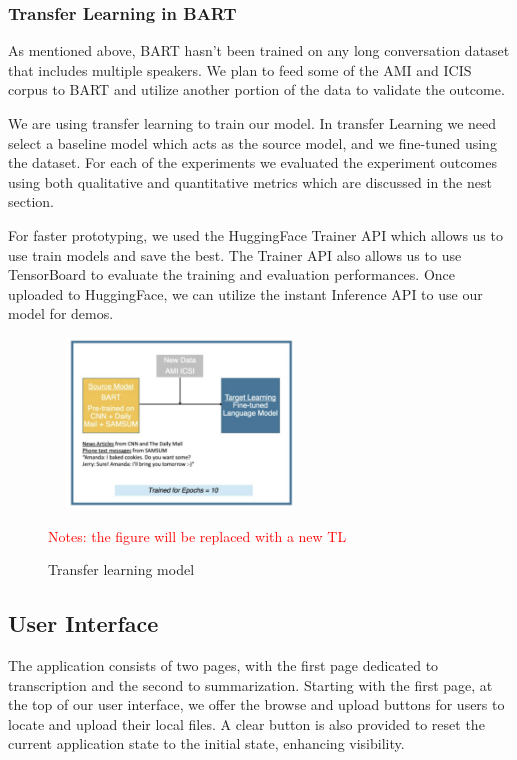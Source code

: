 \subsubsection{Transfer Learning in BART}
As mentioned above, BART hasn’t been trained on any long conversation dataset that includes multiple speakers. We plan to feed some of the AMI and ICIS corpus to BART and utilize another portion of the data to validate the outcome.

We are using transfer learning to train our model. In transfer Learning we need select a baseline model which acts as the source model, and we fine-tuned using the dataset. For each of the experiments we evaluated the experiment outcomes using both qualitative and quantitative metrics which are discussed in the nest section.

For faster prototyping, we used the HuggingFace Trainer API which allows us to use train models and save the best. The Trainer API also allows us to use TensorBoard to evaluate the training and evaluation performances. Once uploaded to HuggingFace, we can utilize the instant Inference API to use our model for demos.


\begin{figure}[thpb]
	\centering
	\includegraphics[width=7cm, height=4.5cm]{figures/TL}
	\caption{Transfer learning model}
	\label{fig:TL}
	\textcolor{red}{Notes: the figure will be replaced with a new TL}
\end{figure}


\subsection{User Interface}
The application consists of two pages, with the first page dedicated to transcription and the second to summarization. Starting with the first page, at the top of our user interface, we offer the browse and upload buttons for users to locate and upload their local files. A clear button is also provided to reset the current application state to the initial state, enhancing visibility.

